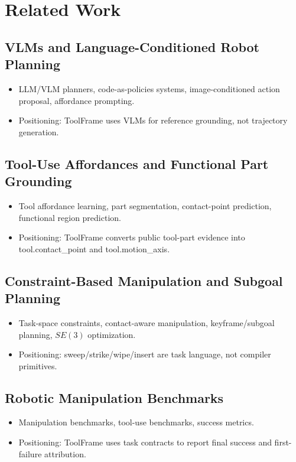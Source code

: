 \documentclass[journal]{IEEEtran}
\newcommand{\method}{ToolFrame}
\begin{document}
\section{Related Work}
\subsection{VLMs and Language-Conditioned Robot Planning}
\begin{itemize}
  \item LLM/VLM planners, code-as-policies systems, image-conditioned action
  proposal, affordance prompting.
  \item Positioning: \method{} uses VLMs for reference grounding, not trajectory
  generation.
\end{itemize}

\subsection{Tool-Use Affordances and Functional Part Grounding}
\begin{itemize}
  \item Tool affordance learning, part segmentation, contact-point prediction,
  functional region prediction.
  \item Positioning: \method{} converts public tool-part evidence into
  tool.contact\_point and tool.motion\_axis.
\end{itemize}

\subsection{Constraint-Based Manipulation and Subgoal Planning}
\begin{itemize}
  \item Task-space constraints, contact-aware manipulation, keyframe/subgoal
  planning, $SE(3)$ optimization.
  \item Positioning: sweep/strike/wipe/insert are task language, not compiler
  primitives.
\end{itemize}

\subsection{Robotic Manipulation Benchmarks}
\begin{itemize}
  \item Manipulation benchmarks, tool-use benchmarks, success metrics.
  \item Positioning: \method{} uses task contracts to report final success and
  first-failure attribution.
\end{itemize}
\end{document}

